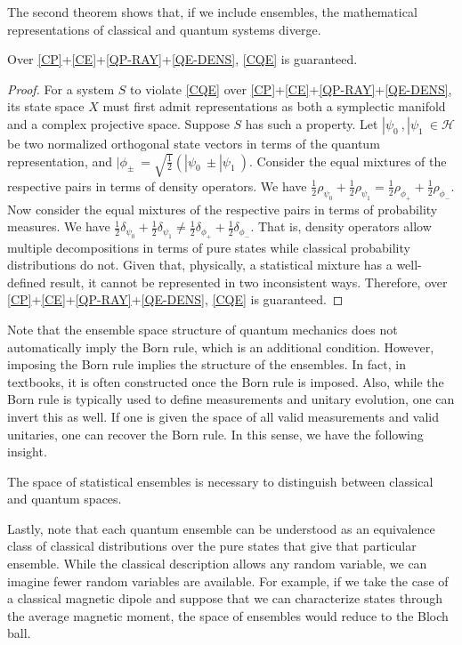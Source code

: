 \documentclass{techbrief}
\begin{document}
The second theorem shows that, if we include ensembles, the mathematical representations of classical and quantum systems diverge.

\begin{thrm}
	Over \ref{CP}+\ref{CE}+\ref{QP-RAY}+\ref{QE-DENS}, \ref{CQE} is guaranteed.
\end{thrm}
\begin{proof}
	For a system $S$ to violate \ref{CQE} over \ref{CP}+\ref{CE}+\ref{QP-RAY}+\ref{QE-DENS}, its state space $X$ must first admit representations as both a symplectic manifold and a complex projective space. Suppose $S$ has such a property. Let $|\psi_0\>, |\psi_1\> \in \mathcal{H}$ be two normalized orthogonal state vectors in terms of the quantum representation, and $|\phi_{\pm} \>= \sqrt{\frac{1}{2}}(|\psi_0\> \pm |\psi_1\>)$. Consider the equal mixtures of the respective pairs in terms of density operators. We have $\frac{1}{2} \rho_{\psi_0} + \frac{1}{2} \rho_{\psi_1} = \frac{1}{2} \rho_{\phi_{+}} + \frac{1}{2} \rho_{\phi_{-}}$. Now consider the equal mixtures of the respective pairs in terms of probability measures. We have $\frac{1}{2} \delta_{\psi_0} + \frac{1}{2} \delta_{\psi_1} \neq \frac{1}{2} \delta_{\phi_{+}} + \frac{1}{2} \delta_{\phi_{-}}$. That is, density operators allow multiple decompositions in terms of pure states while classical probability distributions do not. Given that, physically, a statistical mixture has a well-defined result, it cannot be represented in two inconsistent ways. Therefore, over \ref{CP}+\ref{CE}+\ref{QP-RAY}+\ref{QE-DENS}, \ref{CQE} is guaranteed.
\end{proof}

Note that the ensemble space structure of quantum mechanics does not automatically imply the Born rule, which is an additional condition. However, imposing the Born rule implies the structure of the ensembles. In fact, in textbooks, it is often constructed once the Born rule is imposed. Also, while the Born rule is typically used to define measurements and unitary evolution, one can invert this as well. If one is given the space of all valid measurements and valid unitaries, one can recover the Born rule. In this sense, we have the following insight.

\begin{insight}
	The space of statistical ensembles is necessary to distinguish between classical and quantum spaces.
\end{insight}

Lastly, note that each quantum ensemble can be understood as an equivalence class of classical distributions over the pure states that give that particular ensemble. While the classical description allows any random variable, we can imagine fewer random variables are available. For example, if we take the case of a classical magnetic dipole and suppose that we can characterize states through the average magnetic moment, the space of ensembles would reduce to the Bloch ball.
\end{document}

